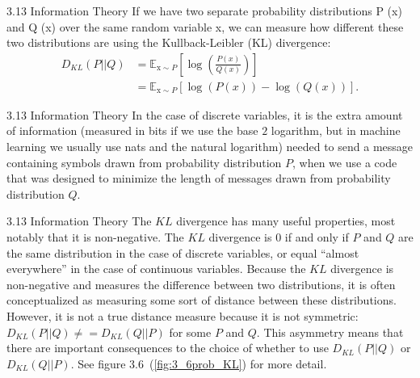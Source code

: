 \begin{frame}{3.13 Information Theory}
    \justifying
    If we have two separate probability distributions P (x) and Q (x) over the same random variable x, we can measure how different these two distributions are using the Kullback-Leibler (KL) divergence:
    \begin{align}
        D_{KL}(P||Q) &= \mathbb{E}_{\mathrm{x} \sim P} \left[\log\left(\frac{P(x)}{Q(x)}\right) \right] \nonumber\\
                     &= \mathbb{E}_{\mathrm{x} \sim P}[\log(P(x)) - \log(Q(x))].
        \label{qe:3_50}
    \end{align}
\end{frame}

\begin{frame}{3.13 Information Theory}
    \justifying
    In the case of discrete variables, it is the extra amount of information (measured in bits if we use the base $2$ logarithm, but in machine learning we usually use nats and the natural logarithm) needed to send a message containing symbols drawn from probability distribution $P$, when we use a code that was designed to minimize the length of messages drawn from probability distribution $Q$.
\end{frame}

\begin{frame}{3.13 Information Theory}
    \justifying
    The $KL$ divergence has many useful properties, most notably that it is non-negative. The $KL$ divergence is $0$ if and only if $P$ and $Q$ are the same distribution in the case of discrete variables, or equal ``almost everywhere'' in the case of continuous variables. Because the $KL$ divergence is non-negative and measures the difference between two distributions, it is often conceptualized as measuring some sort of distance between these distributions. However, it is not a true distance measure because it is not symmetric: $D_{KL}(P||Q) \neq = D_{KL}(Q||P)$ for some $P$ and $Q$. This asymmetry means that there are important consequences to the choice of whether to use $D_{KL}(P||Q)$ or $D_{KL}(Q||P)$. See figure 3.6~(\ref{fig:3_6prob_KL}) for more detail.
\end{frame}

